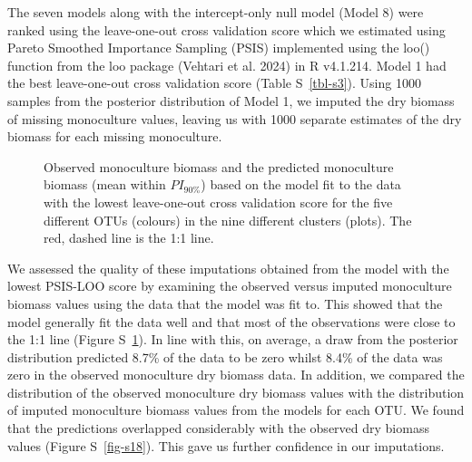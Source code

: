 \documentclass[
  letterpaper,
  DIV=11,
  numbers=noendperiod]{scrartcl}
\begin{document}
The seven models along with the intercept-only null model (Model 8) were
ranked using the leave-one-out cross validation score which we estimated
using Pareto Smoothed Importance Sampling (PSIS) implemented using the
loo() function from the loo package (Vehtari et al. 2024) in R v4.1.214.
Model 1 had the best leave-one-out cross validation score (Table
S~\ref{tbl-s3}). Using 1000 samples from the posterior distribution of
Model 1, we imputed the dry biomass of missing monoculture values,
leaving us with 1000 separate estimates of the dry biomass for each
missing monoculture.

\begin{figure}


\caption{\label{fig-s17}Observed monoculture biomass and the predicted
monoculture biomass (mean within \(PI_{90\%}\)) based on the model fit
to the data with the lowest leave-one-out cross validation score for the
five different OTUs (colours) in the nine different clusters (plots).
The red, dashed line is the 1:1 line.}

\end{figure}%

We assessed the quality of these imputations obtained from the model
with the lowest PSIS-LOO score by examining the observed versus imputed
monoculture biomass values using the data that the model was fit to.
This showed that the model generally fit the data well and that most of
the observations were close to the 1:1 line (Figure S~\ref{fig-s17}). In
line with this, on average, a draw from the posterior distribution
predicted 8.7\% of the data to be zero whilst 8.4\% of the data was zero
in the observed monoculture dry biomass data. In addition, we compared
the distribution of the observed monoculture dry biomass values with the
distribution of imputed monoculture biomass values from the models for
each OTU. We found that the predictions overlapped considerably with the
observed dry biomass values (Figure S~\ref{fig-s18}). This gave us
further confidence in our imputations.
\end{document}
